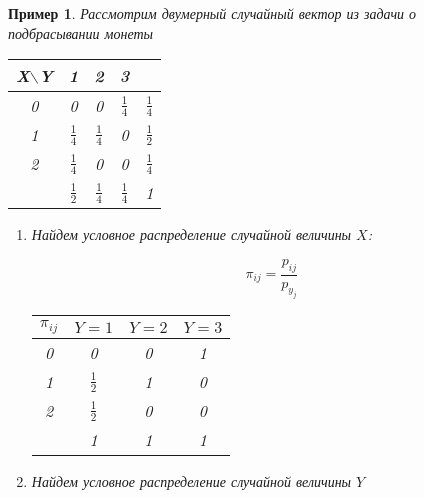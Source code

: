 \documentclass[a4paper, 14pt]{report}
\newtheorem{example}{Пример}[section]
\begin{document}
\begin{example}
    Рассмотрим двумерный случайный вектор из задачи о подбрасывании монеты

    \begin{table}[H]
        \centering
        \begin{tabular}{|c||c|c|c||c|}
            \hline
            X$\backslash$Y & 1 & 2 & 3 & \\
            \hline
            \hline
            0  & 0 & 0 & $\frac{1}{4}$ & $\frac{1}{4}$ \\
            \hline
            1 & $\frac{1}{4}$ & $\frac{1}{4}$ & 0 & $\frac{1}{2}$ \\
            \hline
            2 & $\frac{1}{4}$ & 0 & 0 & $\frac{1}{4}$\\
            \hline
            \hline
            & $\frac{1}{2}$ & $\frac{1}{4}$ & $\frac{1}{4}$ & 1\\
            \hline
        \end{tabular}
    \end{table}

    \begin{enumerate}
        \item Найдем условное распределение случайной величины $X$:

            $$
            \pi_{ij} = \frac{p_{ij}}{p_{y_j}}
            $$

            \begin{table}[H]
                \centering
                \begin{tabular}{|c||c|c|c|}
                    \hline
                    $\pi_{ij}$ & $Y=1$ & $Y=2$ & $Y=3$ \\
                    \hline
                    \hline
                    0  & 0 & 0 & 1 \\
                    \hline
                    1 & $\frac{1}{2}$ & 1 & 0 \\
                    \hline
                    2 & $\frac{1}{2}$ & 0 & 0 \\
                    \hline
                    \hline
                    & 1 & 1 & 1 \\
                    \hline
                \end{tabular}
            \end{table}

        \item Найдем условное распределение случайной величины $Y$


\end{enumerate}
\end{example}
\end{document}
